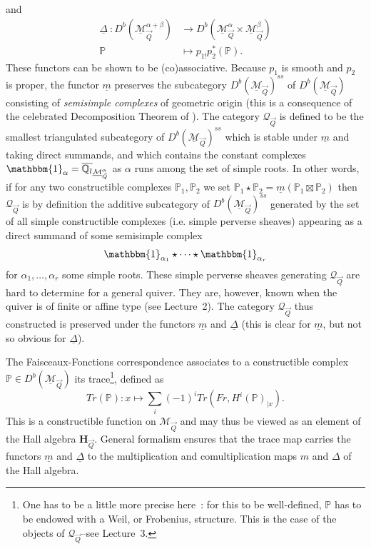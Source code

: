 \documentclass[a4paper,10pt]{amsart}
\numberwithin{equation}{section}
\begin{document}
and 
\begin{equation*}
\begin{split}
\underline{\Delta}~: D^b(\underline{\mathcal{M}}^{\alpha+\beta}_{\vec{Q}})  &\to  D^b(\underline{\mathcal{M}}^{\alpha}_{\vec{Q}} \times \underline{\mathcal{M}}^{\beta}_{\vec{Q}}) \\
\mathbb{P} &\mapsto p_{1!} p_2^* (\mathbb{P}).
\end{split}
\end{equation*}
These functors can be shown to be (co)associative. Because $p_1$ is smooth and $p_2$ is proper, the functor $\underline{m}$ preserves the subcategory $D^b(\underline{\mathcal{M}}_{\vec{Q}})^{ss}$ of $D^b(\underline{\mathcal{M}}_{\vec{Q}})$ consisting of \textit{semisimple complexes} of geometric origin (this is a consequence of the celebrated Decomposition Theorem of \cite{BBD}). The category $\mathcal{Q}_{\vec{Q}}$ is defined to be the smallest triangulated subcategory of $D^b(\underline{\mathcal{M}}_{\vec{Q}})^{ss}$  which is stable under $\underline{m}$ and taking direct summands, and which contains the
constant complexes $\mathbbm{1}_{\alpha}=\overline{\mathbb{Q}_l}_{\underline{\mathcal{M}}_{\vec{Q}}^{\alpha}}$ as $\alpha$ runs among the set of simple roots. In other words, if for any two constructible complexes $\mathbb{P}_1, \mathbb{P}_2$ we set $\mathbb{P}_1 \star \mathbb{P}_2 =\underline{m} ( \mathbb{P}_1 \boxtimes \mathbb{P}_2)$ then $\mathcal{Q}_{\vec{Q}}$ is by definition the additive subcategory of $D^b(\underline{\mathcal{M}}_{\vec{Q}})^{ss}$ generated by the set of all simple constructible complexes (i.e. simple perverse sheaves) appearing as a direct summand of some
semisimple complex
$$\mathbbm{1}_{\alpha_1} \star \cdots \star \mathbbm{1}_{\alpha_r}$$
for $\alpha_1, \ldots, \alpha_r$ some simple roots. These simple perverse sheaves generating $\mathcal{Q}_{\vec{Q}}$ are hard to determine for a general quiver. They are, however, known when the quiver is of finite or affine type (see Lecture~2). The category $\mathcal{Q}_{\vec{Q}}$ thus constructed is preserved under the functors $\underline{m}$ and $\underline{\Delta}$ (this is clear for $\underline{m}$, but not so obvious for $\underline{\Delta}$).

The Faisceaux-Fonctions correspondence associates to a constructible complex $\mathbb{P} \in D^b(\underline{\mathcal{M}}_{\vec{Q}})$ its trace\footnote{One has to be a little more precise here~: for this to be well-defined, $\mathbb{P}$ has to be endowed with a Weil, or Frobenius, structure. This is the case of the objects of $\mathcal{Q}_{\vec{Q}}$--see Lecture~3.}, defined as
$$Tr (\mathbb{P}): x \mapsto \sum_i (-1)^i Tr( Fr, H^i(\mathbb{P})_{|x}).$$
This is a constructible function on $\mathcal{M}_{\vec{Q}}$ and may thus be viewed as an element of the Hall algebra $\mathbf{H}_{\vec{Q}}$. General formalism ensures that the trace map carries the functors $\underline{m}$ and $\underline{\Delta}$ to the multiplication and comultiplication maps $m$ and $\Delta$ of the Hall algebra.
\end{document}
